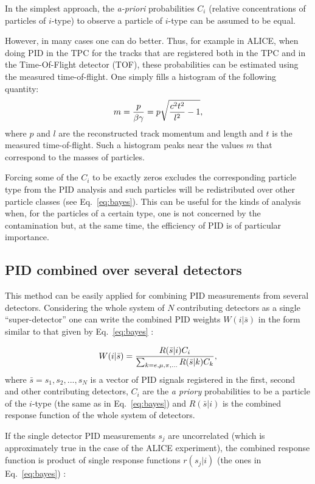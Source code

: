 \documentclass[12pt,a4paper,twoside]{article}
\begin{document}
{In the simplest approach, the {\it a-priori} probabilities
$C_i$ (relative concentrations of particles of $i$-type) to observe a
particle of $i$-type can be assumed to be equal.  

However, in many cases one can do better. Thus, for example in ALICE, 
when doing 
PID in the TPC for the tracks that are registered both in the TPC and 
in the Time-Of-Flight detector (TOF), these probabilities
can be estimated using the measured time-of-flight.  One simply fills a
histogram of the following quantity:
\begin{equation}
m={p\over {\beta\gamma}}=p\sqrt{{{c^2t^2}\over{l^2}} - 1},
\end{equation}
where $p$ and $l$ are the reconstructed track momentum and length and $t$
is the measured time-of-flight. Such a histogram peaks near the values
$m$ that correspond to the masses of particles.

Forcing some of the $C_i$ to be exactly zeros excludes the 
corresponding particle type from the PID analysis and such particles will 
be redistributed over other particle classes (see Eq.~\ref{eq:bayes}).
This can be useful for the kinds of analysis when, for the particles 
of a certain type, one is not concerned by
the contamination but, at the same time, the efficiency of PID is
of particular importance.


\subsection{PID combined over several detectors}
This method can be easily applied for combining PID measurements
from several detectors. Considering the whole system of $N$ contributing 
detectors as a single ``super-detector'' one can write the combined
PID weights $W(i|\bar{s})$ in the form similar to that given by 
Eq.~\ref{eq:bayes} :

\begin{equation}\label{eq:bayes1}
  W(i|\bar{s})={R(\bar{s}|i) C_i \over \sum_{k=e, \mu, \pi,
  ...}{R(\bar{s}|k) C_k}} ,
\end{equation}
where $\bar{s}={s_1, s_2, ..., s_N}$ is a vector of PID signals registered in 
the first, second and other contributing detectors,
$C_i$ are the {\it a priory} probabilities to be a particle of the $i$-type
(the same as in Eq.~\ref{eq:bayes}) and
$R(\bar{s}|i)$ is the combined response function of the whole system
of detectors. 

If the single detector PID measurements $s_j$ are uncorrelated (which is 
approximately true in the case of the ALICE experiment), the
combined response function is product of single response functions
$r(s_j|i)$ (the ones in Eq.~\ref{eq:bayes}) :

}
\end{document}
